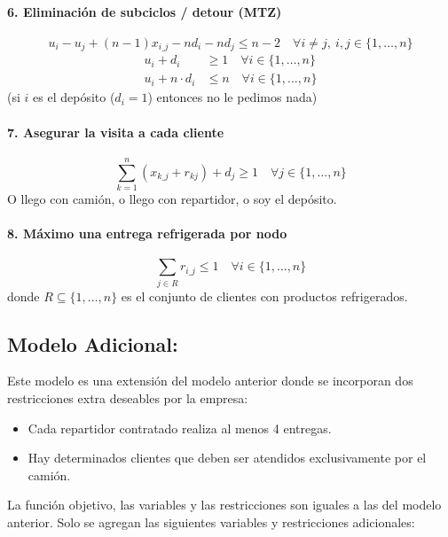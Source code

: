 \documentclass{article}
\begin{document}
    \paragraph{6. Eliminación de subciclos / detour (MTZ)} 
    \[
    u_i - u_j + (n - 1) x_{i\_j} - n d_i - n d_j \leq n - 2 \quad \forall i \ne j,\ i,j \in \{1, \dots, n\}
    \]
    \begin{align*}
    u_i + d_i &\geq 1 \quad \forall i \in \{1, \dots, n\} \\
    u_i + n \cdot d_i &\leq n \quad \forall i \in \{1, \dots, n\}
    \end{align*}
    (si $i$ es el depósito ($d_i=1$) entonces no le pedimos nada)
    
    \paragraph{7. Asegurar la visita a cada cliente}
    \[
    \sum_{k=1}^{n} (x_{k\_j} + r_{kj}) + d_j \geq 1 \quad \forall j \in \{1, \dots, n\}
    \]
    O llego con camión, o llego con repartidor, o soy el depósito.
    
    \paragraph{8. Máximo una entrega refrigerada por nodo}
    \[
    \sum_{j \in R} r_{i\_j} \leq 1 \quad \forall i \in \{1, \dots, n\}
    \]
    donde \( R \subseteq \{1, \dots, n\} \) es el conjunto de clientes con productos refrigerados.
    
    
    
    
    \subsection{Modelo Adicional:} \label{modelo1}
    
    Este modelo es una extensión del modelo anterior donde se incorporan dos restricciones extra deseables por la empresa: 
    \begin{itemize}
        \item Cada repartidor contratado realiza al menos 4 entregas.
        \item Hay determinados clientes que deben ser atendidos exclusivamente por el camión.
    \end{itemize}
    La función objetivo, las variables y las restricciones son iguales a las del modelo anterior. Solo se agregan las siguientes variables y restricciones adicionales:
    
\end{document}
